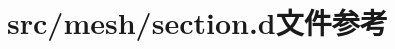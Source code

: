 \hypertarget{src_2mesh_2section_8d}{
\section{src/mesh/section.d文件参考}
\label{src_2mesh_2section_8d}
}
